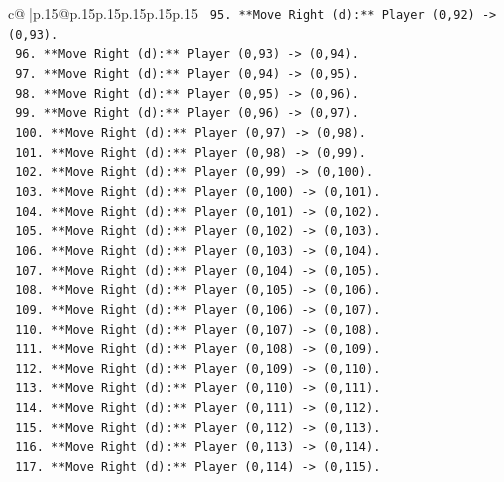 \documentclass{article}
\begin{document}
{\begin{supertabular}{c@{$\;$}|p{.15\linewidth}@{}p{.15\linewidth}p{.15\linewidth}p{.15\linewidth}p{.15\linewidth}p{.15\linewidth}}
{{{\texttt{        95. **Move Right (d):** Player (0,92) {-}> (0,93).} \\
\texttt{        96. **Move Right (d):** Player (0,93) {-}> (0,94).} \\
\texttt{        97. **Move Right (d):** Player (0,94) {-}> (0,95).} \\
\texttt{        98. **Move Right (d):** Player (0,95) {-}> (0,96).} \\
\texttt{        99. **Move Right (d):** Player (0,96) {-}> (0,97).} \\
\texttt{        100. **Move Right (d):** Player (0,97) {-}> (0,98).} \\
\texttt{        101. **Move Right (d):** Player (0,98) {-}> (0,99).} \\
\texttt{        102. **Move Right (d):** Player (0,99) {-}> (0,100).} \\
\texttt{        103. **Move Right (d):** Player (0,100) {-}> (0,101).} \\
\texttt{        104. **Move Right (d):** Player (0,101) {-}> (0,102).} \\
\texttt{        105. **Move Right (d):** Player (0,102) {-}> (0,103).} \\
\texttt{        106. **Move Right (d):** Player (0,103) {-}> (0,104).} \\
\texttt{        107. **Move Right (d):** Player (0,104) {-}> (0,105).} \\
\texttt{        108. **Move Right (d):** Player (0,105) {-}> (0,106).} \\
\texttt{        109. **Move Right (d):** Player (0,106) {-}> (0,107).} \\
\texttt{        110. **Move Right (d):** Player (0,107) {-}> (0,108).} \\
\texttt{        111. **Move Right (d):** Player (0,108) {-}> (0,109).} \\
\texttt{        112. **Move Right (d):** Player (0,109) {-}> (0,110).} \\
\texttt{        113. **Move Right (d):** Player (0,110) {-}> (0,111).} \\
\texttt{        114. **Move Right (d):** Player (0,111) {-}> (0,112).} \\
\texttt{        115. **Move Right (d):** Player (0,112) {-}> (0,113).} \\
\texttt{        116. **Move Right (d):** Player (0,113) {-}> (0,114).} \\
\texttt{        117. **Move Right (d):** Player (0,114) {-}> (0,115).} \\
}}}
\end{supertabular}}
\end{document}
